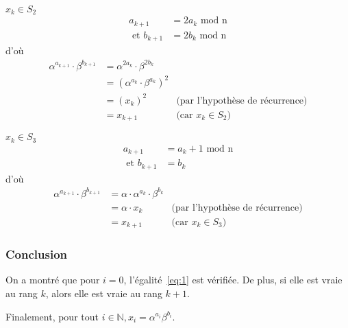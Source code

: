         \underline{$x_{k} \in S_2$}
        \begin{align*}
          a_{k+1} &= 2a_k \text{\ mod n}\\
          \text{\ et } b_{k+1} &= 2b_k \text{\ mod n}
        \end{align*}
        d'où
        \begin{align*}
          \alpha^{a_{k+1}} \cdot \beta^{b_{k+1}} &= \alpha^{2a_k} \cdot \beta^{2b_k} \\
                                                 &= {(\alpha^{a_k} \cdot \beta^{a_k})}^2 \\
                                                 &= {(x_k)}^2 & \text{(par l'hypothèse de récurrence)} \\
                                                 &= x_{k+1} & \text{(car $x_k \in S_2$)}
        \end{align*}

        \underline{$x_{k} \in S_3$}
        \begin{align*}
          a_{k+1} &= a_k + 1 \text{\ mod n} \\
          \text{\ et } b_{k+1} &= b_k
        \end{align*}
        d'où
        \begin{align*}
          \alpha^{a_{k+1}} \cdot \beta^{b_{k+1}} &= \alpha \cdot \alpha^{a_k} \cdot \beta^{b_k} \\
                                                 &= \alpha \cdot x_k & \text{(par l'hypothèse de récurrence)} \\
                                                 &= x_{k+1} & \text{(car $x_k \in S_3$)}
        \end{align*}


        \subsubsection{Conclusion}
        On a montré que pour $i = 0$, l'égalité~\ref{eq:1} est vérifiée.
        De plus, si elle est vraie au rang $k$, alors elle est vraie au rang $k+1$.

        Finalement, pour tout $i \in \mathbb{N}, x_i = \alpha^{a_i} \beta^{b_i}$.
